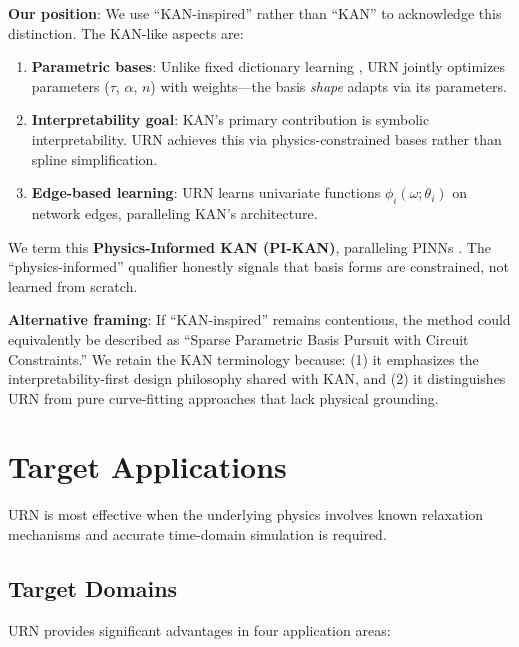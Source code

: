 \documentclass{ieeeaccess}
\begin{document}
\textbf{Our position}: We use ``KAN-inspired'' rather than ``KAN'' to acknowledge this distinction. The KAN-like aspects are:
\begin{enumerate}
\item \textbf{Parametric bases}: Unlike fixed dictionary learning \cite{mairal2009online}, URN jointly optimizes parameters ($\tau$, $\alpha$, $n$) with weights---the basis \textit{shape} adapts via its parameters.
\item \textbf{Interpretability goal}: KAN's primary contribution is symbolic interpretability. URN achieves this via physics-constrained bases rather than spline simplification.
\item \textbf{Edge-based learning}: URN learns univariate functions $\phi_i(\omega; \theta_i)$ on network edges, paralleling KAN's architecture.
\end{enumerate}

We term this \textbf{Physics-Informed KAN (PI-KAN)}, paralleling PINNs \cite{raissi2019physics}. The ``physics-informed'' qualifier honestly signals that basis forms are constrained, not learned from scratch.

\textbf{Alternative framing}: If ``KAN-inspired'' remains contentious, the method could equivalently be described as ``Sparse Parametric Basis Pursuit with Circuit Constraints.'' We retain the KAN terminology because: (1) it emphasizes the interpretability-first design philosophy shared with KAN, and (2) it distinguishes URN from pure curve-fitting approaches that lack physical grounding.

\section{Target Applications}
\label{sec:discussion}

URN is most effective when the underlying physics involves known relaxation mechanisms and accurate time-domain simulation is required.

\subsection{Target Domains}

URN provides significant advantages in four application areas:
\end{document}
